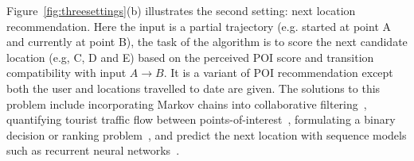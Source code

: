 Figure~\ref{fig:threesettings}(b) illustrates the second setting: next location recommendation.
Here the input is a partial trajectory (e.g. started at point A and currently at point B), the task of the algorithm is to score the next candidate location (e.g, C, D and E) based on the perceived POI score and transition compatibility with input $A\rightarrow B$.
It is a variant of POI recommendation except both the user and locations travelled to date are given. The solutions to this problem include incorporating Markov chains into collaborative filtering~\cite{fpmc10,ijcai13,zhang2015location},
quantifying tourist traffic flow between points-of-interest~\cite{zheng2012patterns},
formulating a binary decision or ranking problem~\cite{baraglia2013learnext}, and predict the next location with sequence models such as recurrent neural networks~\cite{aaai16}.


